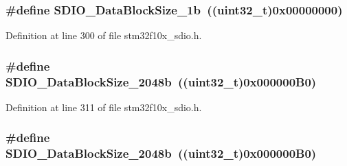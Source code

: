 \subsubsection[{\texorpdfstring{S\+D\+I\+O\+\_\+\+Data\+Block\+Size\+\_\+1b}{SDIO_DataBlockSize_1b}}]{\setlength{\rightskip}{0pt plus 5cm}\#define S\+D\+I\+O\+\_\+\+Data\+Block\+Size\+\_\+1b~(({\bf uint32\+\_\+t})0x00000000)}\hypertarget{group___s_d_i_o___data___block___size_gaa86e90ddc3426b242a5230b3360c620d}{}\label{group___s_d_i_o___data___block___size_gaa86e90ddc3426b242a5230b3360c620d}


Definition at line 300 of file stm32f10x\+\_\+sdio.\+h.

\subsubsection[{\texorpdfstring{S\+D\+I\+O\+\_\+\+Data\+Block\+Size\+\_\+2048b}{SDIO_DataBlockSize_2048b}}]{\setlength{\rightskip}{0pt plus 5cm}\#define S\+D\+I\+O\+\_\+\+Data\+Block\+Size\+\_\+2048b~(({\bf uint32\+\_\+t})0x000000\+B0)}\hypertarget{group___s_d_i_o___data___block___size_ga41eb937621c7ffcf2688c6bc0ea31464}{}\label{group___s_d_i_o___data___block___size_ga41eb937621c7ffcf2688c6bc0ea31464}


Definition at line 311 of file stm32f10x\+\_\+sdio.\+h.

\subsubsection[{\texorpdfstring{S\+D\+I\+O\+\_\+\+Data\+Block\+Size\+\_\+2048b}{SDIO_DataBlockSize_2048b}}]{\setlength{\rightskip}{0pt plus 5cm}\#define S\+D\+I\+O\+\_\+\+Data\+Block\+Size\+\_\+2048b~(({\bf uint32\+\_\+t})0x000000\+B0)}\hypertarget{group___s_d_i_o___data___block___size_ga41eb937621c7ffcf2688c6bc0ea31464}{}\label{group___s_d_i_o___data___block___size_ga41eb937621c7ffcf2688c6bc0ea31464}


